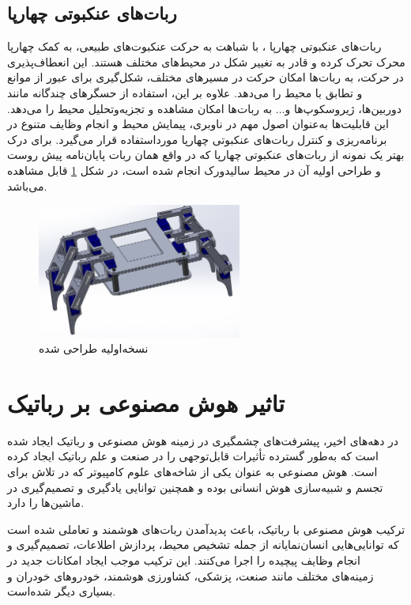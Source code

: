 \subsection{ربات‌های عنکبوتی چهارپا}
ربات‌های عنکبوتی چهارپا
\noindent\unskip{}
، با شباهت به حرکت عنکبوت‌های طبیعی، به کمک چهارپا محرک تحرک کرده و قادر به تغییر شکل در محیط‌های مختلف هستند. این انعطاف‌پذیری در حرکت، به ربات‌ها امکان حرکت در مسیرهای مختلف، شکل‌گیری برای عبور از موانع و تطابق با محیط را می‌دهد. علاوه بر این، استفاده از حسگرهای چندگانه مانند دوربین‌ها، ژیروسکوپ‌ها و... به ربات‌ها امکان مشاهده و تجزیه‌وتحلیل محیط را می‌دهد. این قابلیت‌ها به‌عنوان اصول مهم در ناوبری، پیمایش محیط و انجام وظایف متنوع در برنامه‌ریزی و کنترل ربات‌های عنکبوتی چهارپا مورداستفاده قرار می‌گیرد.
برای درک بهتر یک نمونه از ربات‌های عنکبوتی چهارپا که در واقع همان ربات پایان‌نامه پیش روست و طراحی اولیه آن در محیط سالیدورک انجام شده است، در شکل 
\ref{نسخه‌اولیه }
قابل مشاهده می‌باشد.

\begin{figure}[h]
	\centering
	\includegraphics[width=0.6\textwidth]{./images/Chapter1/Robot_Final}	
	\caption[نسخه‌اولیه طراحی شده]{نسخه‌اولیه طراحی شده}
	\label{نسخه‌اولیه }
\end{figure}
\noindent
\unskip

\section{تاثیر هوش مصنوعی بر رباتیک}

در دهه‌های اخیر، پیشرفت‌های چشمگیری در زمینه هوش مصنوعی و رباتیک ایجاد شده است که به‌طور گسترده تأثیرات قابل‌توجهی را در صنعت و علم رباتیک ایجاد کرده است. هوش مصنوعی به عنوان یکی از شاخه‌های علوم کامپیوتر که در تلاش برای تجسم و شبیه‌سازی هوش انسانی بوده و همچنین توانایی یادگیری و تصمیم‌گیری در ماشین‌ها را دارد.

ترکیب هوش مصنوعی با رباتیک، باعث پدیدآمدن ربات‌های هوشمند و تعاملی شده است که توانایی‌هایی انسان‌نمایانه از جمله تشخیص محیط، پردازش اطلاعات، تصمیم‌گیری و انجام وظایف پیچیده را اجرا می‌کنند. این ترکیب موجب ایجاد امکانات جدید در زمینه‌های مختلف مانند صنعت، پزشکی، کشاورزی هوشمند، خودروهای خودران و بسیاری دیگر شده‌است.

